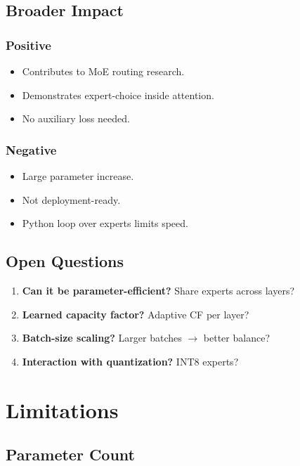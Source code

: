 \subsection{Broader Impact}

\subsubsection{Positive}
\begin{itemize}
\item Contributes to MoE routing research.
\item Demonstrates expert-choice inside attention.
\item No auxiliary loss needed.

\end{itemize}
\subsubsection{Negative}
\begin{itemize}
\item Large parameter increase.
\item Not deployment-ready.
\item Python loop over experts limits speed.

\end{itemize}
\subsection{Open Questions}

\begin{enumerate}
\item \textbf{Can it be parameter-efficient?} Share experts across layers?
\item \textbf{Learned capacity factor?} Adaptive CF per layer?
\item \textbf{Batch-size scaling?} Larger batches $\to$ better balance?
\item \textbf{Interaction with quantization?} INT8 experts?

\end{enumerate}


\section{Limitations}

\subsection{Parameter Count}

